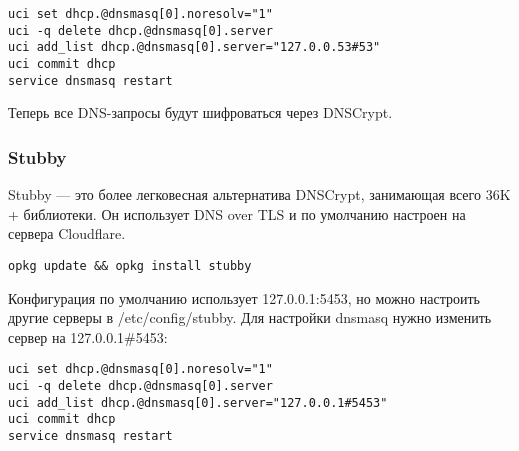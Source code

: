 \begin{lstlisting}[frame=rlbt]
uci set dhcp.@dnsmasq[0].noresolv="1"
uci -q delete dhcp.@dnsmasq[0].server
uci add_list dhcp.@dnsmasq[0].server="127.0.0.53#53"
uci commit dhcp
service dnsmasq restart
\end{lstlisting}

Теперь все DNS-запросы будут шифроваться через DNSCrypt.

\subsubsection*{Stubby}

Stubby — это более легковесная альтернатива DNSCrypt, занимающая всего 36K + библиотеки. Он использует DNS over TLS и по умолчанию настроен на сервера Cloudflare.

\begin{lstlisting}[frame=rlbt]
opkg update && opkg install stubby
\end{lstlisting}

Конфигурация по умолчанию использует 127.0.0.1:5453, но можно настроить другие серверы в /etc/config/stubby. Для настройки dnsmasq нужно изменить сервер на 127.0.0.1\#5453:

\begin{lstlisting}[frame=rlbt]
uci set dhcp.@dnsmasq[0].noresolv="1"
uci -q delete dhcp.@dnsmasq[0].server
uci add_list dhcp.@dnsmasq[0].server="127.0.0.1#5453"
uci commit dhcp
service dnsmasq restart
\end{lstlisting}
